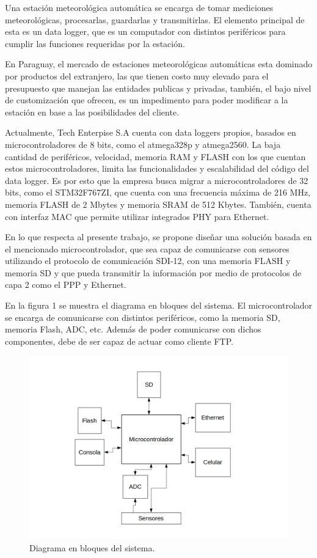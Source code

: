 \documentclass[
11pt, %
]{charter}
\begin{document}
Una estación meteorológica automática se encarga de tomar mediciones meteorológicas, procesarlas, guardarlas y transmitirlas. El elemento principal de esta es un data logger, que es un computador con distintos periféricos para cumplir las funciones requeridas por la estación. 

En Paraguay, el mercado de estaciones meteorológicas automáticas esta dominado por productos del extranjero, las que tienen costo muy elevado para el presupuesto que manejan las entidades publicas y privadas, también, el bajo nivel de customización que ofrecen, es un impedimento para poder modificar a la estación en base a las posibilidades del cliente.

Actualmente, Tech Enterpise S.A cuenta con data loggers propios, basados en microcontroladores de 8 bits, como el atmega328p y atmega2560. La baja cantidad de periféricos, velocidad, memoria RAM y FLASH con los que cuentan estos microcontroladores, limita las funcionalidades y escalabilidad del código del data logger. Es por esto que la empresa busca migrar a microcontroladores de 32 bits, como el STM32F767ZI, que cuenta con una frecuencia máxima de 216 MHz, memoria FLASH de 2 Mbytes y memoria SRAM de 512 Kbytes. También, cuenta con interfaz MAC que permite utilizar integrados PHY para Ethernet.   

En lo que respecta al presente trabajo, se propone diseñar una solución basada en el mencionado microcontrolador, que sea capaz de comunicarse con sensores utilizando el protocolo de comunicación SDI-12, con una memoria FLASH y memoria SD y que pueda transmitir la información por medio de protocolos de capa 2 como el PPP y Ethernet.

En la figura 1 se muestra el diagrama en bloques del sistema. El microcontrolador se encarga de comunicarse con distintos periféricos, como la memoria SD, memoria Flash, ADC, etc. Además de poder comunicarse con dichos componentes, debe de ser capaz de actuar como cliente FTP.


\begin{figure}[htpb]
\centering 
\includegraphics[width=.9\textwidth]{./Figuras/Diagrama_de_bloques_modulos.jpg}
\caption{Diagrama en bloques del sistema.}
\label{fig:diagBloques}
\end{figure}
\end{document}
